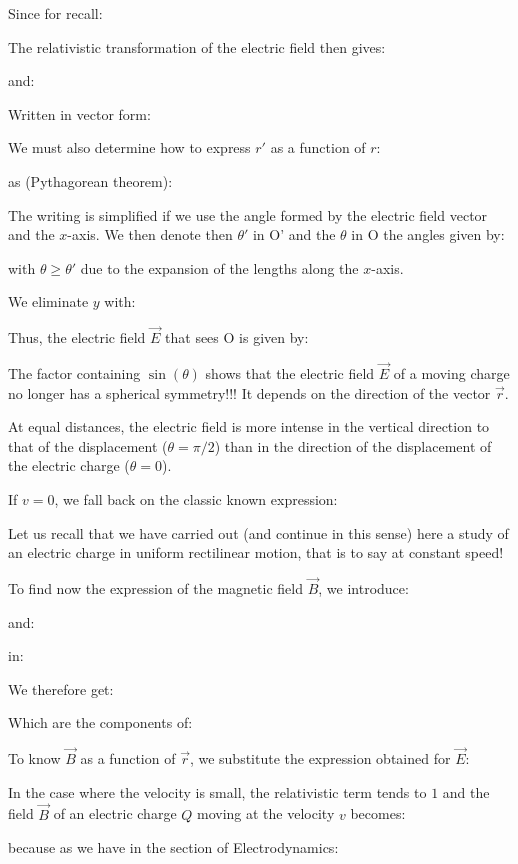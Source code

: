 	Since for recall:
	
	The relativistic transformation of the electric field then gives:
	
	and:
	
	Written in vector form:
	
	We must also determine how to express $r'$ as a function of $r$:
	
	as (Pythagorean theorem):
	
	The writing is simplified if we use the angle formed by the electric field vector and the $x$-axis. We then denote then $\theta'$ in O' and the $\theta$ in O the angles given by:
	
	with $\theta\geq \theta'$ due to the expansion of the lengths along the $x$-axis.

	We eliminate $y$ with:
	
	Thus, the electric field $\vec{E}$ that sees O is given by:
	
	The factor containing $\sin(\theta)$ shows that the electric field $\vec{E}$ of a moving charge no longer has a spherical symmetry!!! It depends on the direction of the vector $\vec{r}$.

	At equal distances, the electric field is more intense in the vertical direction to that of the displacement ($\theta=\pi/2$) than in the direction of the displacement of the electric charge ($\theta=0$).

	If $v = 0$, we fall back on the classic known expression:
	
	\begin{tcolorbox}[title=Remark,colframe=black,arc=10pt]
	Let us recall that we have carried out (and continue in this sense) here a study of an electric charge in uniform rectilinear motion, that is to say at constant speed!
	\end{tcolorbox}
	To find now the expression of the magnetic field $\vec{B}$, we introduce:
	
	and:
	
	in:
	
	We therefore get:
	
	Which are the components of:
	
	To know $\vec{B}$ as a function of $\vec{r}$, we substitute the expression obtained for $\vec{E}$:
	
	In the case where the velocity is small, the relativistic term tends to $1$ and the field $\vec{B}$ of an electric charge $Q$ moving at the velocity $v$ becomes:
	
	because as we have in the section of Electrodynamics: 
	
